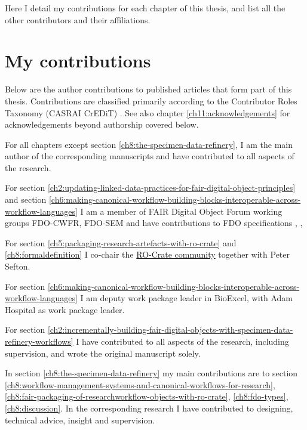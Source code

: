 \label{ch10:contributions} 

Here I detail my contributions for each chapter of this thesis, and
list all the other contributors and their affiliations.

\section{My contributions}\label{ch10:my-contributions}

Below are the author contributions to published articles that form part
of this thesis. Contributions are classified primarily according to the
Contributor Roles Taxonomy (CASRAI CrEDiT) \cite{Brand 2015}. See 
also chapter \vref{ch11:acknowledgements} for acknowledgements beyond authorship covered below.

For all chapters except section \ref{ch8:the-specimen-data-refinery}, I am the main author of the corresponding
manuscripts and have contributed to all aspects of the research. 

For section \ref{ch2:updating-linked-data-practices-for-fair-digital-object-principles} and section \ref{ch6:making-canonical-workflow-building-blocks-interoperable-across-workflow-languages} I am a member of FAIR Digital Object Forum working groups FDO-CWFR, FDO-SEM and have contributions to FDO specifications \cite{fdo-RequirementSpec}, \cite{fdo-Overview}, 

For section \ref{ch5:packaging-research-artefacts-with-ro-crate} and \ref{ch8:formaldefinition} I co-chair the
\href{https://www.researchobject.org/ro-crate/community}{RO-Crate
community} together with Peter Sefton. 

For section \ref{ch6:making-canonical-workflow-building-blocks-interoperable-across-workflow-languages} I am deputy work package leader in BioExcel, with Adam
Hospital as work package leader.

For section \ref{ch2:incrementally-building-fair-digital-objects-with-specimen-data-refinery-workflows} I have contributed to all aspects of the research,
including supervision, and wrote the original manuscript solely.

In section \ref{ch8:the-specimen-data-refinery} my main contributions are to section \ref{ch8:workflow-management-systems-and-canonical-workflows-for-research}, \ref{ch8:fair-packaging-of-researchworkflow-objects-with-ro-crate}, \ref{ch8:fdo-types},
\ref{ch8:discussion}. In the corresponding research I have contributed to designing, technical advice, insight and supervision.

